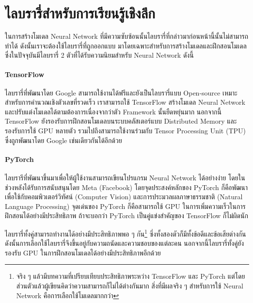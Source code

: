 \section{ไลบรารี่สำหรับการเรียนรู้เชิงลึก}
\label{sec:lib_dl}

ในการสร้างโมเดล Neural Network ที่มีความซับซ้อนนั้นไลบรารี่ที่กล่าวมาก่อนหน้านี้นั้นไม่สามารถทำได้ ดังนั้นเราจะต้องใช้ไลบรารี่ที่ถูกออกแบบ%
มาโดยเฉพาะสำหรับการสร้างโมเดลและฝึกสอนโมเดล ซึ่งในปัจจุบันมีไลบรารี่ 2 ตัวที่ได้รับความนิยมสำหรับ Neural Network ดังนี้

\paragraph{TensorFlow}
ไลบรารี่ที่พัฒนาโดย Google สามารถใช้งานได้ฟรีและยังเป็นไลบรารี่แบบ Open-source เหมาะสำหรับการคำนวณเชิงตัวเลขที่รวดเร็ว เราสามารถใช้ 
TensorFlow สร้างโมเดล Neural Network และปรับแต่งโมเดลได้ตามต้องการเนื่องจากว่าตัว Framework นั้นยืดหยุ่นมาก นอกจากนี้ TensorFlow 
ยังรองรับการฝึกสอนโมเดลบนระบบคลัสเตอร์แบบ Distributed Memory และรองรับการใช้ GPU หลายตัว รวมไปถึงสามารถใช้งานร่วมกับ Tensor 
Processing Unit (TPU) ซึ่งถูกพัฒนาโดย Google เช่นเดียวกันได้อีกด้วย

\paragraph{PyTorch} 
ไลบรารีที่พัฒนาขึ้นมาเพื่อให้ผู้ใช้งานสามารถเขียนโปรแกรม Neural Network ได้อย่างง่าย โดยในช่วงหลังได้รับการสนับสนุนโดย Meta (Facebook) 
โดยจุดประสงค์หลักของ PyTorch ก็คือพัฒนาเพื่อใช้กับคอมพิวเตอร์วิทัศน์ (Computer Vision) และการประมวลผลภาษาธรรมชาติ (Natural Language Processing) จุดเด่นของ PyTorch 
ก็คือสามารถใช้ GPU ในการเพิ่มความเร็วในการฝึกสอนได้อย่างมีประสิทธิภาพ ถ้าจะบอกว่า PyTorch เป็นคู่แข่งสำคัญของ TensorFlow ก็ไม่ผิดนัก

ไลบรารี่ทั้งคู่สามารถทำงานได้อย่างมีประสิทธิภาพพอ ๆ กัน\footnote{จริง ๆ แล้วมีบทความที่เปรียบเทียบประสิทธิภาพระหว่าง TensorFlow และ 
PyTorch แต่โดยส่วนตัวแล้วผู้เขียนคิดว่าความสามารถก็ไม่ได้ต่างกันมาก สิ่งที่มีผลจริง ๆ สำหรับการใช้ Neural Network คือการเลือกใช้โมเดลมากกว่า}
ซึ่งทั้งสองตัวก็มีทั้งข้อดีและข้อเสียต่างกัน ดังนั้นการเลือกใช้ไลบรารี่จึงขึ้นอยู่กับความถนัดและความชอบของแต่ละคน นอกจากนี้ไลบรารี่ทั้งคู่ยังรองรับ
GPU ในการฝึกสอนโมเดลได้อย่างมีประสิทธิภาพอีกด้วย

